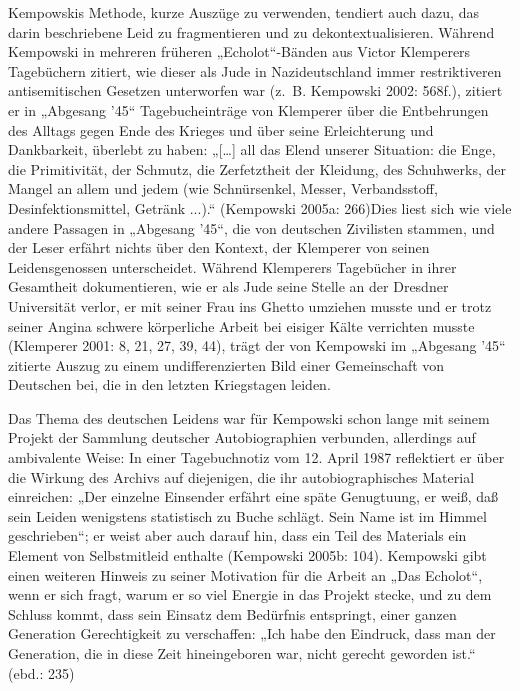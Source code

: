 \begin{multicols*}{2}
Kempowskis Methode, kurze Auszüge zu verwenden, tendiert auch dazu, das darin beschriebene Leid zu fragmentieren und zu dekontextualisieren. Während Kempowski in mehreren früheren „Echolot“-Bänden aus Victor Klemperers Tagebüchern zitiert, wie dieser als Jude in Nazideutschland immer restriktiveren antisemitischen Gesetzen unterworfen war (z. B. Kempowski 2002: 568f.), zitiert er in „Abgesang ’45“ Tagebucheinträge von Klemperer über die Entbehrungen des Alltags gegen Ende des Krieges und über seine Erleichterung und Dankbarkeit, überlebt zu haben: „[…] all das Elend unserer Situation: die Enge, die Primitivität, der Schmutz, die Zerfetztheit der Kleidung, des Schuhwerks, der Mangel an allem und jedem (wie Schnürsenkel, Messer, Verbandsstoff, Desinfektionsmittel, Getränk ...).“ (Kempowski 2005a: 266)Dies liest sich wie viele andere Passagen in „Abgesang ’45“, die von deutschen Zivilisten stammen, und der Leser erfährt nichts über den Kontext, der Klemperer von seinen Leidensgenossen unterscheidet. Während Klemperers Tagebücher in ihrer Gesamtheit dokumentieren, wie er als Jude seine Stelle an der Dresdner Universität verlor, er mit seiner Frau ins Ghetto umziehen musste und er trotz seiner Angina schwere körperliche Arbeit bei eisiger Kälte verrichten musste (Klemperer 2001: 8, 21, 27, 39, 44), trägt der von Kempowski im „Abgesang ’45“ zitierte Auszug zu einem undifferenzierten Bild einer Gemeinschaft von Deutschen bei, die in den letzten Kriegstagen leiden. 

Das Thema des deutschen Leidens war für Kempowski schon lange mit seinem Projekt der Sammlung deutscher Autobiographien verbunden, allerdings auf ambivalente Weise: In einer Tagebuchnotiz vom 12. April 1987 reflektiert er über die Wirkung des Archivs auf diejenigen, die ihr autobiographisches Material einreichen: „Der einzelne Einsender erfährt eine späte Genugtuung, er weiß, daß sein Leiden wenigstens statistisch zu Buche schlägt. Sein Name ist im Himmel geschrieben“; er weist aber auch darauf hin, dass ein Teil des Materials ein Element von Selbstmitleid enthalte (Kempowski 2005b: 104). Kempowski gibt einen weiteren Hinweis zu seiner Motivation für die Arbeit an „Das Echolot“, wenn er sich fragt, warum er so viel Energie in das Projekt stecke, und zu dem Schluss kommt, dass sein Einsatz dem Bedürfnis entspringt, einer ganzen Generation Gerechtigkeit zu verschaffen: „Ich habe den Eindruck, dass man der Generation, die in diese Zeit hineingeboren war, nicht gerecht geworden ist.“ (ebd.: 235)


\end{multicols*}

